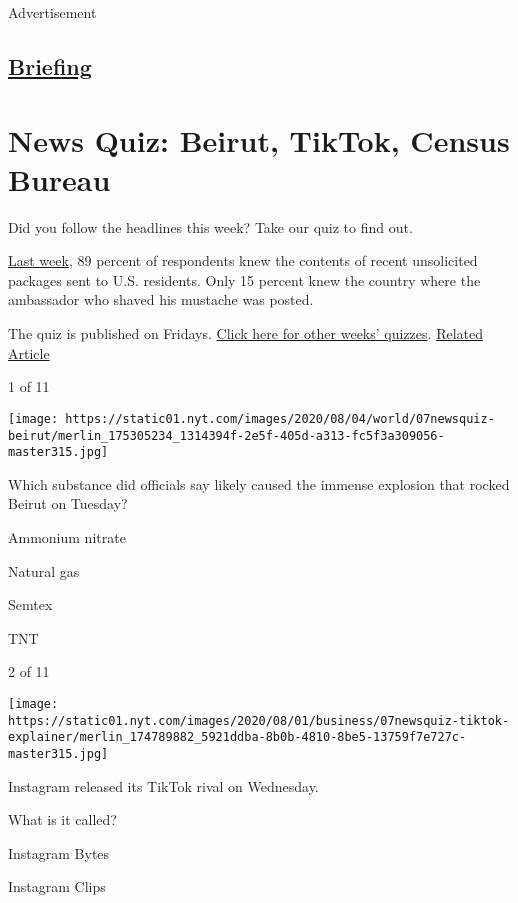 Advertisement

\hypertarget{-briefing-}{%
\subsection{\texorpdfstring{
\href{/interactive/2018/briefing/global-morning-briefing-newsletter-signup.html}{Briefing}
}{ Briefing }}\label{-briefing-}}

\hypertarget{news-quiz-beirut-tiktok-census-bureau}{%
\section{News Quiz: Beirut, TikTok, Census
Bureau}\label{news-quiz-beirut-tiktok-census-bureau}}

Did you follow the headlines this week? Take our quiz to find out.

\href{https://www.nytimes.com/interactive/2020/07/31/briefing/troops-baseball-louie-gohmert-news-quiz.html}{Last
week}, 89 percent of respondents knew the contents of recent unsolicited
packages sent to U.S. residents. Only 15 percent knew the country where
the ambassador who shaved his mustache was posted.

The quiz is published on Fridays.
\href{https://www.nytimes.com/spotlight/news-quiz}{Click here for other
weeks' quizzes}.
\href{https://www.nytimes.com/interactive/2020/07/31/briefing/troops-baseball-louie-gohmert-news-quiz.html}{Related
Article}

1 of 11

\texttt{[image: https://static01.nyt.com/images/2020/08/04/world/07newsquiz-beirut/merlin\_175305234\_1314394f-2e5f-405d-a313-fc5f3a309056-master315.jpg]}

Which substance did officials say likely caused the immense explosion
that rocked Beirut on Tuesday?

Ammonium nitrate

Natural gas

Semtex

TNT

2 of 11

\texttt{[image: https://static01.nyt.com/images/2020/08/01/business/07newsquiz-tiktok-explainer/merlin\_174789882\_5921ddba-8b0b-4810-8be5-13759f7e727c-master315.jpg]}

Instagram released its TikTok rival on Wednesday.

What is it called?

Instagram Bytes

Instagram Clips

